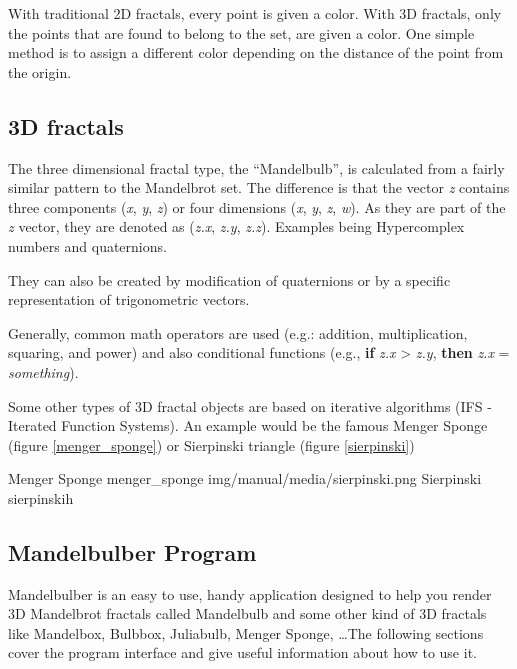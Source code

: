 With traditional 2D fractals, every point is given a color. With 3D fractals,
only the points that are found to belong to the set, are given a color.
One simple method is to assign a different color depending on the distance of the point from the origin.

\subsection{3D fractals}\label{d-fractals}

The three dimensional fractal type, the ``Mandelbulb'', is calculated from a
fairly similar pattern to the Mandelbrot set. The difference is that the vector
\emph{z} contains three components (\emph{x}, \emph{y}, \emph{z}) or four
dimensions (\emph{x}, \emph{y}, \emph{z}, \emph{w}). As they are part of the
\emph{z} vector, they are denoted as (\emph{z.x}, \emph{z.y}, \emph{z.z}).
Examples being Hypercomplex numbers and quaternions.

They can also be created by modification of quaternions or by a specific
representation of trigonometric vectors. 

Generally, common math operators are
used (e.g.: addition, multiplication, squaring, and power) and also
conditional functions (e.g., \textbf{if} \emph{z.x} \textgreater{} \emph{z.y},
\textbf{then} \emph{z.x} = \emph{something}).

Some other types of 3D fractal objects are based on iterative algorithms (IFS -
Iterated Function Systems). An example would be the famous Menger Sponge (figure \ref{menger_sponge}) or Sierpinski triangle (figure \ref{sierpinski})
\nopagebreak

{Menger Sponge}
{menger_sponge}
{img/manual/media/sierpinski.png}
{Sierpinski}
{sierpinski}{h}

\subsection{Mandelbulber Program}\label{mandelbulber-program}

Mandelbulber is an easy to use, handy application designed to help you render 3D
Mandelbrot fractals called Mandelbulb and some other kind of 3D fractals like
Mandelbox, Bulbbox, Juliabulb, Menger Sponge, \dots The following sections
cover the program interface and give useful information about how to use it.
